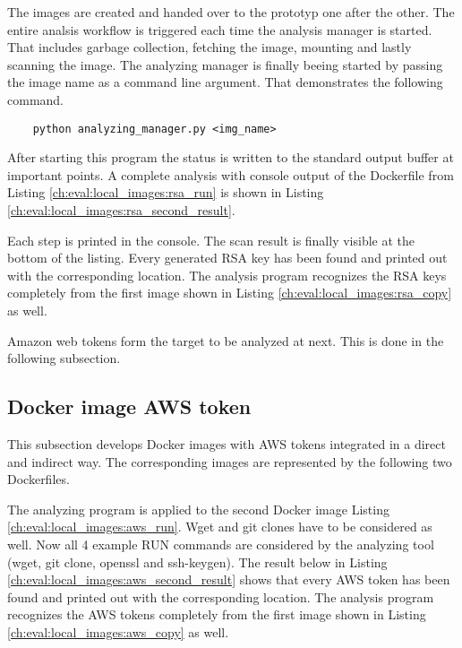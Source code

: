 The images are created and handed over to the prototyp one after the other.
The entire analsis workflow is triggered each time the analysis manager is started. 
That includes garbage collection, fetching the image, mounting and lastly scanning the image.
The analyzing manager is finally beeing started by passing the image name as a command line argument. 
That demonstrates the following command.
\begin{lstlisting}
	python analyzing_manager.py <img_name>
\end{lstlisting}
After starting this program the status is written to the standard output buffer at important points.
A complete analysis with console output of the Dockerfile from Listing \ref{ch:eval:local_images:rsa_run} is shown in Listing \ref{ch:eval:local_images:rsa_second_result}.

Each step is printed in the console. The scan result is finally visible at the bottom of the listing. 
Every generated RSA key has been found and printed out with the corresponding location.
The analysis program recognizes the RSA keys completely from the first image shown in Listing \ref{ch:eval:local_images:rsa_copy} as well. 

Amazon web tokens form the target to be analyzed at next. This is done in the following subsection. 

\subsection{Docker image AWS token}
\label{ch:eval:local_images:aws}
This subsection develops Docker images with AWS tokens integrated in a direct and indirect way. 
The corresponding images are represented by the following two Dockerfiles.


The analyzing program is applied to the second Docker image Listing \ref{ch:eval:local_images:aws_run}. 
Wget and git clones have to be considered as well. 
Now all 4 example RUN commands are considered by the analyzing tool (wget, git clone, openssl and ssh-keygen). 
The result below in Listing \ref{ch:eval:local_images:aws_second_result} shows that every AWS token has been found and printed out with the corresponding location.
The analysis program recognizes the AWS tokens completely from the first image shown in Listing \ref{ch:eval:local_images:aws_copy} as well.



